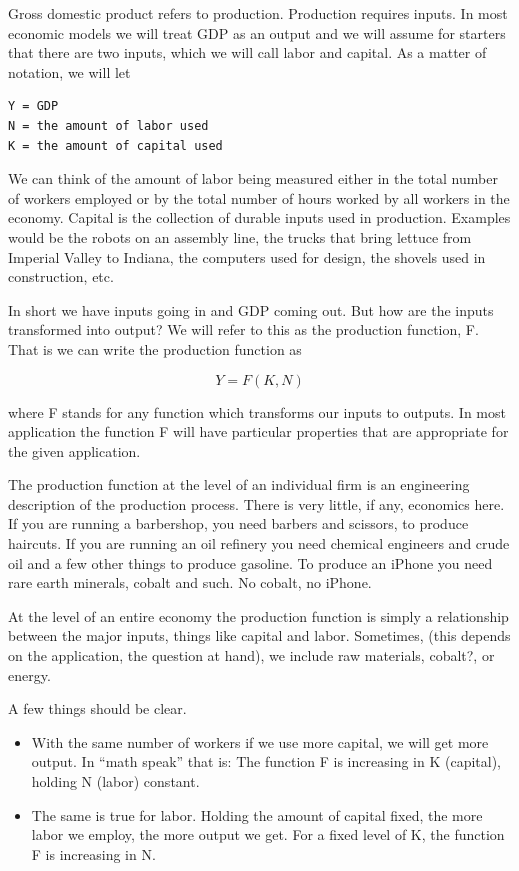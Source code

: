 \documentclass[
]{book}
\providecommand{\tightlist}{%
  \setlength{\itemsep}{0pt}\setlength{\parskip}{0pt}}
\begin{document}
Gross domestic product refers to production. Production requires inputs. In most economic models we will treat GDP as an output and we will assume for starters that there are two inputs, which we will call labor and capital. As a matter of notation, we will let

\begin{verbatim}
Y = GDP
N = the amount of labor used
K = the amount of capital used
\end{verbatim}

We can think of the amount of labor being measured either in the total number of workers employed or by the total number of hours worked by all workers in the economy. Capital is the collection of durable inputs used in production. Examples would be the robots on an assembly line, the trucks that bring lettuce from Imperial Valley to Indiana, the computers used for design, the shovels used in construction, etc.

In short we have inputs going in and GDP coming out. But how are the inputs transformed into output? We will refer to this as the production function, F. That is we can write the production function as

\[Y = F(K,N)\]

where F stands for any function which transforms our inputs to outputs. In most application the function F will have particular properties that are appropriate for the given application.

The production function at the level of an individual firm is an engineering description of the production process. There is very little, if any, economics here. If you are running a barbershop, you need barbers and scissors, to produce haircuts. If you are running an oil refinery you need chemical engineers and crude oil and a few other things to produce gasoline. To produce an iPhone you need rare earth minerals, cobalt and such. No cobalt, no iPhone.

At the level of an entire economy the production function is simply a relationship between the major inputs, things like capital and labor. Sometimes, (this depends on the application, the question at hand), we include raw materials, cobalt?, or energy.

A few things should be clear.

\begin{itemize}
\tightlist
\item
  With the same number of workers if we use more capital, we will get more output. In ``math speak'' that is: The function F is increasing in K (capital), holding N (labor) constant.\\
\item
  The same is true for labor. Holding the amount of capital fixed, the more labor we employ, the more output we get. For a fixed level of K, the function F is increasing in N.
\end{itemize}
\end{document}
